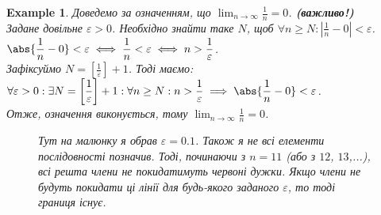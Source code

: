 \documentclass[a4paper, 14pt]{article}
\theoremstyle{theoremdd}
\theoremstyle{theoremdd}
\theoremstyle{theoremdd}
\theoremstyle{theoremdd}
\newtheorem{example}[theorem]{Example}
\theoremstyle{theoremdd}
\theoremstyle{theoremdd}
\theoremstyle{theoremdd}
\theoremstyle{theoremdd}
\begin{document}
	\begin{example} Доведемо за означенням, що $\displaystyle\lim_{n \to \infty} \frac{1}{n} = 0$. \textbf{(важливо!)}\\
	Задане довільне $\varepsilon > 0$. Необхідно знайти таке $N$, щоб $\displaystyle  \forall n \geq N: \left|\frac{1}{n}-0 \right|<\varepsilon$.\\
	$\displaystyle \abs{\frac{1}{n} - 0} < \varepsilon \iff \displaystyle \frac{1}{n}<\varepsilon \iff n > \frac{1}{\varepsilon}$.\\
	Зафіксуймо $\displaystyle N = \left[\frac{1}{\varepsilon} \right] + 1$. Тоді маємо: $\forall \varepsilon > 0: \exists N = \displaystyle \left[\frac{1}{\varepsilon} \right] + 1: \forall n \geq N: n > \frac{1}{\varepsilon} \implies \abs{\frac{1}{n} - 0} < \varepsilon$.\\
	Отже, означення виконується, тому $\displaystyle\lim_{n \to \infty} \frac{1}{n} = 0$.
	\begin{figure}[H]
	\centering
	\resizebox{0.8\textwidth}{!} {
}
	\caption*{Тут на малюнку я обрав $\varepsilon = 0.1$. Також я не всі елементи послідовності позначив. Тоді, починаючи з $n=11$ (або з $12$, $13$,...), всі решта члени не покидатимуть червоні дужки. Якщо члени не будуть покидати ці лінії для будь-якого заданого $\varepsilon$, то тоді границя існує.}
	\end{figure}
	\end{example}
\end{document}
